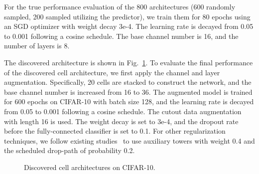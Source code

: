 \documentclass[runningheads]{llncs}
\begin{document}
For the true performance evaluation of the 800 architectures (600 randomly sampled, 200 sampled utilizing the predictor), we train them for 80 epochs using an SGD optimizer with weight decay 3e-4. The learning rate is decayed from 0.05 to 0.001 following a cosine schedule. The base channel number is 16, and the number of layers is 8.

The discovered architecture is shown in Fig.~\ref{fig:enas_discover_cell}. To evaluate the final performance of the discovered cell architecture, we first apply the channel and layer augmentation. Specifically, 20 cells are stacked to construct the network, and the base channel number is increased from 16 to 36. The augmented model is trained for 600 epochs on CIFAR-10 with batch size 128, and the learning rate is decayed from 0.05 to 0.001 following a cosine schedule. The cutout data augmentation with length 16 is used. The weight decay is set to 3e-4, and the dropout rate before the fully-connected classifier is set to 0.1. For other regularization techniques, we follow existing studies~\cite{zoph2018learning,darts} to use auxiliary towers with weight 0.4 and the scheduled drop-path of probability 0.2. 



\begin{figure}[th]
  \begin{center}
    \caption{Discovered cell architectures on CIFAR-10.}
    \label{fig:enas_discover_cell}
  \end{center}
  \vspace{-5pt}
\end{figure}
\end{document}
